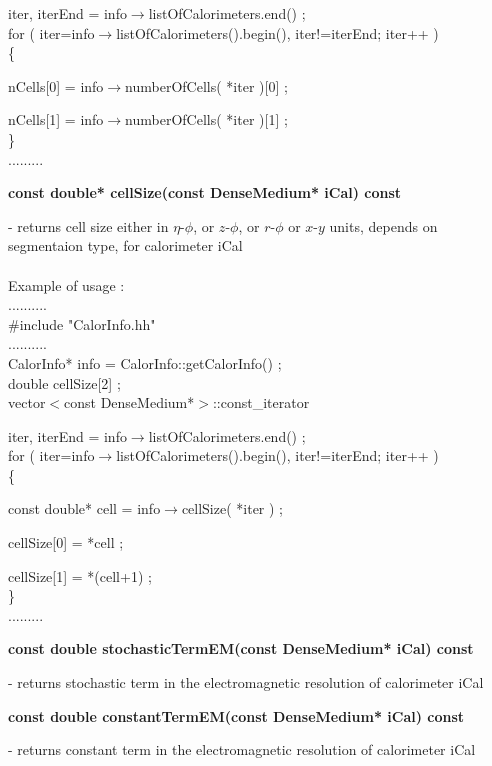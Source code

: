       iter, iterEnd = info$\rightarrow$listOfCalorimeters.end() ; \\  
   for ( iter=info$\rightarrow$listOfCalorimeters().begin(), iter!=iterEnd; iter++ )\\
   \{ 

      nCells[0] = info$\rightarrow$numberOfCells( *iter )[0] ;

      nCells[1] = info$\rightarrow$numberOfCells( *iter )[1] ;\\
   \} \\
   .........\\
   
\begin{center}
   {\bf const double* cellSize(const DenseMedium* iCal) const }
\end{center}
   - returns cell size either in $\eta$-$\phi$, or $z$-$\phi$, or $r$-$\phi$ or $x$-$y$ units, 
   depends on segmentaion type, for calorimeter iCal \\
   \\
   Example of usage : \\
   .......... \\
   \#include "CalorInfo.hh" \\
   .......... \\
   CalorInfo* info = CalorInfo::getCalorInfo() ; \\
   double cellSize[2] ; \\
   vector$<$const DenseMedium*$>$::const\_iterator 
   
      iter, iterEnd = info$\rightarrow$listOfCalorimeters.end() ; \\   
   for ( iter=info$\rightarrow$listOfCalorimeters().begin(), iter!=iterEnd; iter++ ) \\
   \{ 

      const double* cell = info$\rightarrow$cellSize( *iter ) ; 

      cellSize[0] = *cell ; 

      cellSize[1] = *(cell+1) ; \\
   \} \\
   .........
   
\begin{center}
   {\bf const double stochasticTermEM(const DenseMedium* iCal) const }
\end{center}
   - returns stochastic term in the electromagnetic
   resolution of calorimeter iCal 

\begin{center}
   {\bf const double constantTermEM(const DenseMedium* iCal) const }
\end{center}
   - returns constant term in the electromagnetic
   resolution of calorimeter iCal 

